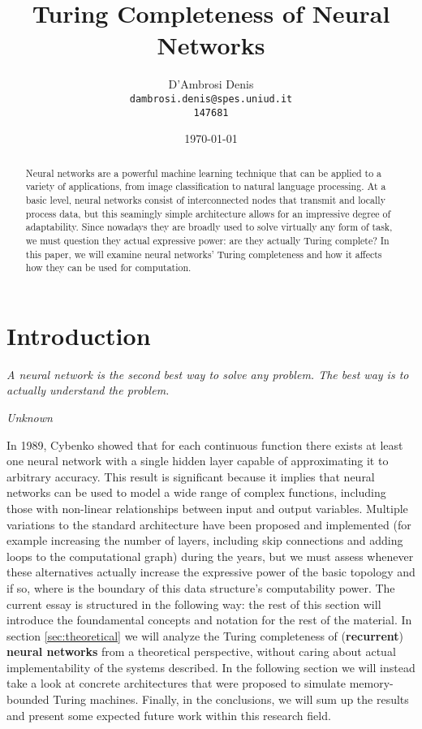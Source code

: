 \documentclass{article}
\title{Turing Completeness of Neural Networks}
\author{D'Ambrosi Denis \\ \small \texttt{dambrosi.denis@spes.uniud.it} \\ \small \texttt{147681}}
\date{\today}
\begin{document}
\maketitle

\begin{abstract}
    Neural networks are a powerful machine learning technique that can be applied to a variety of applications, from image classification to natural language processing. At a basic level, neural networks consist of interconnected nodes that transmit and locally process data, but this seamingly simple architecture allows for an impressive degree of adaptability. Since nowadays they are broadly used to solve virtually any form of task, we must question they actual expressive power: are they actually Turing complete?
    In this paper, we will examine neural networks' Turing completeness and how it affects how they can be used for computation.
\end{abstract}

\tableofcontents

\newpage

\section{Introduction}

\epigraph{\textit{A neural network is the second best way to solve any problem. The best way is to actually understand the problem.}}{\textit{Unknown}}

In 1989, Cybenko \cite{CYB89} showed that for each continuous function there exists at least one neural network with a single hidden layer capable of approximating it to arbitrary accuracy. This result is significant because it implies that neural networks can be used to model a wide range of complex functions, including those with non-linear relationships between input and output variables. 
Multiple variations to the standard architecture have been proposed and implemented (for example increasing the number of layers, including skip connections and adding loops to the computational graph) during the years, but we must assess whenever these alternatives actually increase the expressive power of the basic topology and if so, where is the boundary of this data structure's computability power.
The current essay is structured in the following way: the rest of this section will introduce the foundamental concepts and notation for the rest of the material. In section \ref{sec:theoretical} we will analyze the Turing completeness of (\textbf{recurrent}) \textbf{neural networks} from a theoretical perspective, without caring about actual implementability of the systems described. In the following section we will instead take a look at concrete architectures that were proposed to simulate memory-bounded Turing machines. Finally, in the conclusions, we will sum up the results and present some expected future work within this research field.
\end{document}
